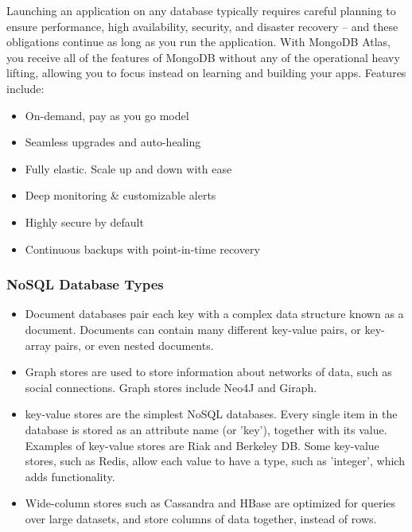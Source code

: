 Launching an application on any database typically requires careful planning to ensure performance, high availability, security, and disaster recovery – and these obligations continue as long as you run the application. With MongoDB Atlas, you receive all of the features of MongoDB without any of the operational heavy lifting, allowing you to focus instead on learning and building your apps. Features include:
\begin{itemize}
	\item On-demand, pay as you go model
	\item Seamless upgrades and auto-healing
	\item Fully elastic. Scale up and down with ease
	\item Deep monitoring \& customizable alerts
	\item Highly secure by default
	\item Continuous backups with point-in-time recovery
\end{itemize}
\subsubsection{NoSQL Database Types}
\begin{itemize}
	\item Document databases pair each key with a complex data structure known as a document. Documents can contain many different key-value pairs, or key-array pairs, or even nested documents.
	\item Graph stores are used to store information about networks of data, such as social connections. Graph stores include Neo4J and Giraph.
	\item key-value stores are the simplest NoSQL databases. Every single item in the database is stored as an attribute name (or 'key'), together with its value. Examples of key-value stores are Riak and Berkeley DB. Some key-value stores, such as Redis, allow each value to have a type, such as 'integer', which adds functionality.
	\item Wide-column stores such as Cassandra and HBase are optimized for queries over large datasets, and store columns of data together, instead of rows.
\end{itemize}
